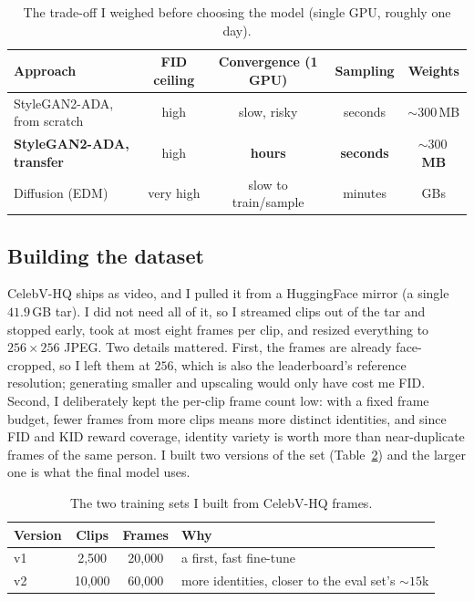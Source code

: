 \documentclass{article}
\begin{document}
\begin{table}[h]
\centering
\caption{The trade-off I weighed before choosing the model (single GPU, roughly one day).}
\label{tab:modelchoice}
\begin{tabular}{lcccc}
\toprule
Approach & FID ceiling & Convergence (1 GPU) & Sampling & Weights \\
\midrule
StyleGAN2-ADA, from scratch      & high   & slow, risky & seconds & ${\sim}300$\,MB \\
\textbf{StyleGAN2-ADA, transfer} & high   & \textbf{hours} & \textbf{seconds} & \textbf{${\sim}300$\,MB} \\
Diffusion (EDM)~\citep{karras2022edm} & very high & slow to train/sample & minutes & GBs \\
\bottomrule
\end{tabular}
\end{table}

\subsection{Building the dataset}
CelebV-HQ ships as video, and I pulled it from a HuggingFace mirror (a single $41.9$\,GB tar). I did not
need all of it, so I streamed clips out of the tar and stopped early, took at most eight frames per clip,
and resized everything to $256\times256$ JPEG. Two details mattered. First, the frames are already
face-cropped, so I left them at $256$, which is also the leaderboard's reference resolution; generating
smaller and upscaling would only have cost me FID. Second, I deliberately kept the per-clip frame count
low: with a fixed frame budget, fewer frames from more clips means more distinct identities, and since
FID and KID reward coverage, identity variety is worth more than near-duplicate frames of the same person.
I built two versions of the set (Table~\ref{tab:data}) and the larger one is what the final model uses.

\begin{table}[h]
\centering
\caption{The two training sets I built from CelebV-HQ frames.}
\label{tab:data}
\begin{tabular}{lccl}
\toprule
Version & Clips & Frames & Why \\
\midrule
v1 & 2{,}500  & 20{,}000 & a first, fast fine-tune \\
v2 & 10{,}000 & 60{,}000 & more identities, closer to the eval set's ${\sim}15$k \\
\bottomrule
\end{tabular}
\end{table}
\end{document}
